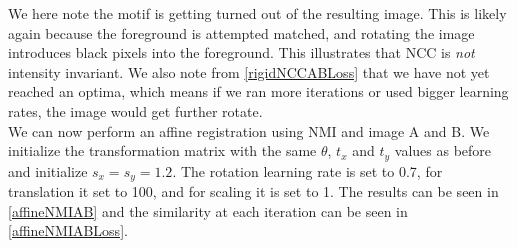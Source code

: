 We here note the motif is getting turned out of the resulting image. This is likely again because the foreground is attempted matched, and rotating the image introduces black pixels into the foreground. This illustrates that NCC is \textit{not} intensity invariant. We also note from \autoref{rigidNCCABLoss} that we have not yet reached an optima, which means if we ran more iterations or used bigger learning rates, the image would get further rotate.\\
We can now perform an affine registration using NMI and image A and B. We initialize the transformation matrix with the same $\theta$, $t_x$ and $t_y$ values as before and initialize $s_x = s_y = 1.2$. The rotation learning rate is set to 0.7, for translation it set to 100, and for scaling it is set to 1. The results can be seen in \autoref{affineNMIAB} and the similarity at each iteration can be seen in \autoref{affineNMIABLoss}.

